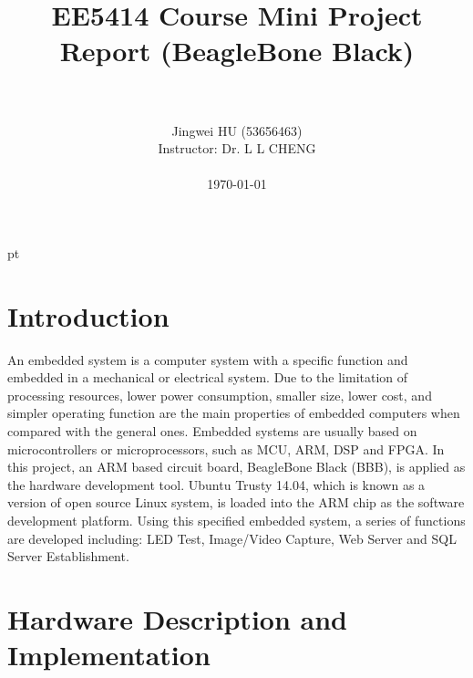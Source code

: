 \documentclass[12pt,journal,draftclsnofoot,onecolumn]{IEEEtran}
\begin{document}

 pt

\begin{titlepage}
\thispagestyle{empty}


\title{EE5414 Course Mini Project Report (BeagleBone Black)}

\author{\\
\author{\authorblockN}{Jingwei HU (53656463)}\\
Instructor: Dr. L L CHENG\\
\\
\today}

\maketitle
\end{titlepage}

\tableofcontents
{}
\clearpage

\section{Introduction}\label{Intro}
An embedded system is a computer system with a specific function and embedded in a mechanical or electrical system. Due to the limitation of processing resources, lower power consumption, smaller size, lower cost, and simpler operating function are the main properties of embedded computers when compared with the general ones. Embedded systems are usually based on microcontrollers or microprocessors, such as MCU, ARM, DSP and FPGA. In this project, an ARM based circuit board, BeagleBone Black (BBB), is applied as the hardware development tool. Ubuntu Trusty 14.04, which is known as a version of open source Linux system, is loaded into the ARM chip as the software development platform. Using this specified embedded system, a series of functions are developed including: LED Test, Image/Video Capture, Web Server and SQL Server Establishment.


\section{Hardware Description and Implementation}\label{HdDes}
\end{document}
